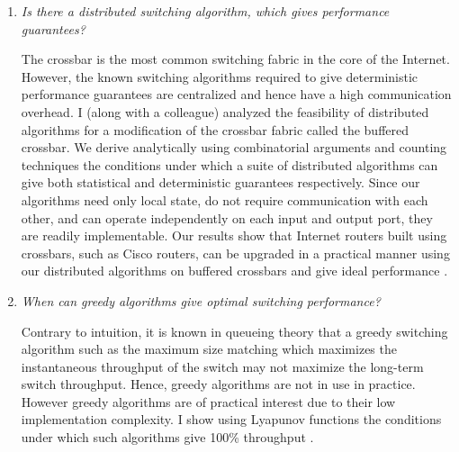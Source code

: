 \documentclass[11pt, a4paper]{article}
\begin{document}
\begin{small}
\begin{enumerate}
\item {\em Is there a distributed switching algorithm, which gives performance guarantees?}


The crossbar is the most common switching fabric in the core of the Internet. However,
the known switching algorithms required to give deterministic performance 
guarantees are centralized and hence have a high communication overhead.
I (along with a colleague) analyzed the feasibility of distributed algorithms for a
modification of the crossbar fabric called the buffered crossbar.
We derive analytically using combinatorial arguments and counting techniques the
conditions under which a suite of distributed algorithms can give 
both statistical and deterministic
guarantees respectively. 
Since our algorithms need only local state, do not require communication with each other, 
and can operate independently on each input and output port, they are readily implementable.
Our results show that Internet routers built using crossbars, such as Cisco routers, can 
be upgraded in a practical manner using our distributed 
algorithms on buffered crossbars and give ideal performance \cite{buffxbar}.


\item {\em When can greedy algorithms give optimal switching performance?}


Contrary to intuition, it is known in queueing theory that a greedy
switching algorithm such as the maximum size matching which
maximizes the instantaneous throughput of the switch may not
maximize the long-term switch throughput. Hence, greedy algorithms
are not in use in practice.
However greedy algorithms are of practical interest due to their low implementation complexity.
I show using Lyapunov functions the conditions under which
such algorithms give 100\% throughput \cite{msm}.


\end{enumerate}
\end{small}
\end{document}
